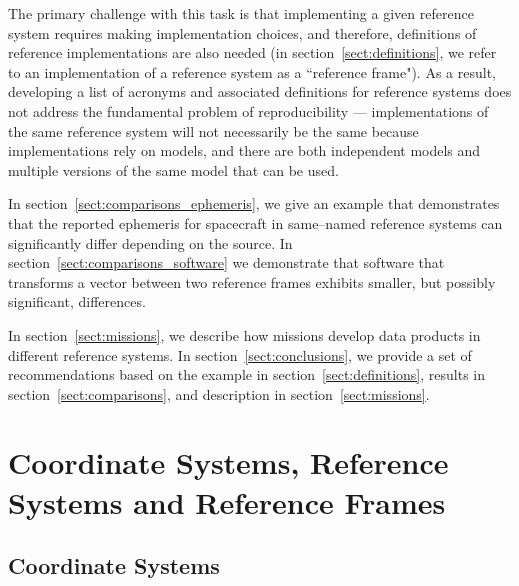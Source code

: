 \documentclass[draft]{agujournal2019}
\begin{document}
The primary challenge with this task is that implementing a given reference system requires making implementation choices, and therefore, definitions of reference implementations are also needed (in section~\ref{sect:definitions}, we refer to an implementation of a reference system as a ``reference frame"). As a result, developing a list of acronyms and associated definitions for reference systems does not address the fundamental problem of reproducibility --- implementations of the same reference system will not necessarily be the same because implementations rely on models, and there are both independent models and multiple versions of the same model that can be used.

In section~\ref{sect:comparisons_ephemeris}, we give an example that demonstrates that the reported ephemeris for spacecraft in same--named reference systems can significantly differ depending on the source. In section~\ref{sect:comparisons_software} we demonstrate that software that transforms a vector between two reference frames exhibits smaller, but possibly significant, differences.

In section~\ref{sect:missions}, we describe how missions develop data products in different reference systems. In section~\ref{sect:conclusions}, we provide a set of recommendations based on the example in section~\ref{sect:definitions}, results in section~\ref{sect:comparisons}, and description in section~\ref{sect:missions}.

\section{Coordinate Systems, Reference Systems and Reference Frames}
\label{sect:terminology}


\subsection{Coordinate Systems}
\end{document}
